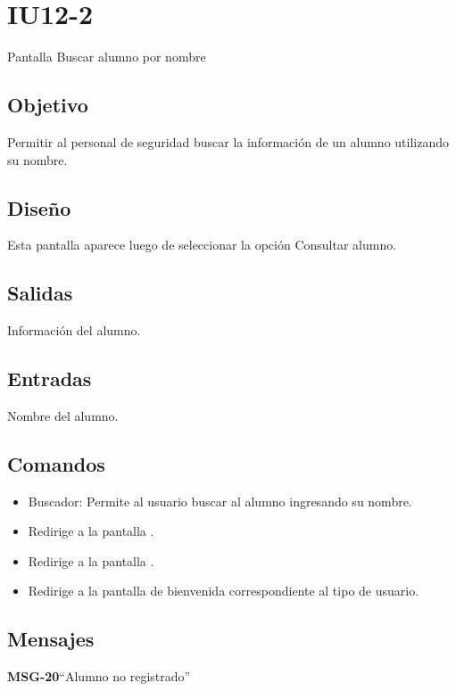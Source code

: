 \section{IU12-2} {Pantalla Buscar alumno por nombre}

\subsection{Objetivo}
Permitir al personal de seguridad buscar la información de un alumno utilizando su nombre. 

\subsection{Diseño}
Esta pantalla  aparece luego de seleccionar la opción Consultar alumno. 


\subsection{Salidas}
Información del alumno.

\subsection{Entradas}
Nombre del alumno. 

\subsection{Comandos}

\begin{itemize}

	\item Buscador: Permite al usuario buscar al alumno ingresando su nombre. 
	\item {} Redirige a la pantalla .
    \item {} Redirige a la pantalla .
    \item {} Redirige a la pantalla de bienvenida correspondiente al tipo de usuario.
\end{itemize}

\subsection{Mensajes}

\begin{Citemize}
	\item {\bf MSG-20}{``Alumno no registrado''}
\end{Citemize}


